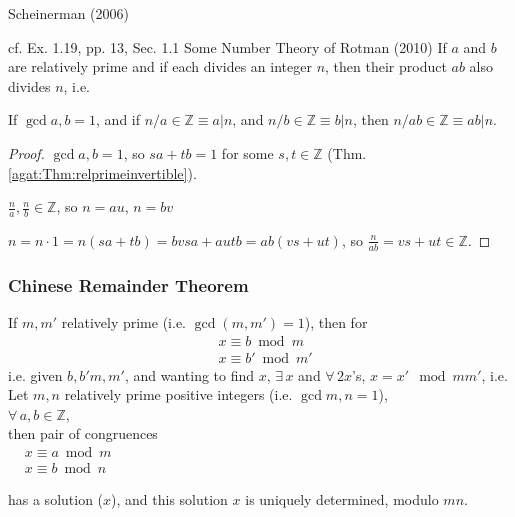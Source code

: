 Scheinerman (2006) \cite{agat:Sche2006}

cf. Ex. 1.19, pp. 13, Sec. 1.1 Some Number Theory of Rotman (2010) \cite{agat:JRotman2010}
If $a$ and $b$ are relatively prime and if each divides an integer $n$, then their product $ab$ also divides $n$, i.e. 
\begin{theorem}\label{agat:Thm:relprimeproddivisible}
	If $\gcd{a,b}=1$, and if $n/a \in \mathbb{Z} \equiv a | n$, and $n/b \in \mathbb{Z} \equiv b | n$, then $n/ab \in \mathbb{Z} \equiv ab | n$.  
\end{theorem}
\begin{proof}
	$\gcd{a,b}=1$, so $sa + tb= 1$ for some $s,t \in \mathbb{Z}$ (Thm. \ref{agat:Thm:relprimeinvertible}).  
	
	$\frac{n}{a}, \frac{n}{b} \in \mathbb{Z}$, so $n=au$, $n=bv$  
	
	$n = n\cdot 1 = n(sa+tb) = bvsa + autb = ab(vs + ut)$, so $\frac{n}{ab} = vs + ut \in \mathbb{Z}$.  
	\end{proof}

\subsubsection{Chinese Remainder Theorem}

\begin{theorem}
	If $m,m'$ relatively prime (i.e. $\gcd(m,m')=1$), then for 
\[
\begin{aligned}
	& x \equiv b \bmod{m} \\ 
	& x\equiv b'\bmod{m'}
\end{aligned}
\]
i.e. given $b,b'm,m'$, and wanting to find $x$, 
$\exists \, x$ and $\forall \, 2 x$'s, $x=x'\mod{mm'}$, i.e.  \\  

  Let $m,n$ relatively prime positive integers (i.e. $\gcd{m,n}=1$), \\
  $\forall \, a,b\in \mathbb{Z}$, \\
  then pair of congruences \\
  $\begin{aligned}
  & x \equiv a\bmod{m} \\
  & x \equiv b\bmod{n} 
  \end{aligned}$
 
 has a solution ($x$), and this solution $x$ is uniquely determined, modulo $mn$.  
\end{theorem}


